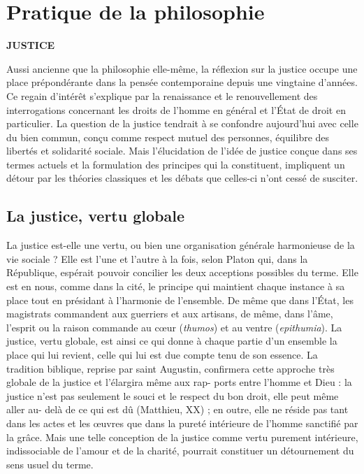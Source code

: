 
\section{Pratique de la philosophie}

{\bf JUSTICE}

Aussi ancienne que la philosophie elle-même, la réflexion sur la justice occupe
une place prépondérante dans la pensée
contemporaine depuis une vingtaine
d'années. Ce regain d'intérêt s'explique
par la renaissance et le renouvellement
des interrogations concernant les droits
de l’homme en général et l’État de droit
en particulier. La question de la justice
tendrait à se confondre aujourd’hui avec
%
celle du bien commun, conçu comme
respect mutuel des personnes, équilibre
des libertés et solidarité sociale. Mais
l'élucidation de l’idée de justice conçue
dans ses termes actuels et la formulation
des principes qui la constituent,
impliquent un détour par les théories
classiques et les débats que celles-ci
n'ont cessé de susciter.

\subsection{La justice, vertu globale}

La justice est-elle une vertu, ou bien
une organisation générale harmonieuse
de la vie sociale ? Elle est l’une et l’autre
à la fois, selon Platon qui, dans la République, espérait pouvoir concilier les
deux acceptions possibles du terme. Elle
est en nous, comme dans la cité, le principe qui maintient chaque instance à sa
place tout en présidant à l'harmonie de
l’ensemble. De même que dans l'État,
les magistrats commandent aux guerriers
et aux artisans, de même, dans l’âme,
l'esprit ou la raison commande au cœur
({\it thumos}) et au ventre ({\it epithumia}). La
justice, vertu globale, est ainsi ce qui
donne à chaque partie d’un ensemble la
place qui lui revient, celle qui lui est due
compte tenu de son essence. La tradition
biblique, reprise par saint Augustin,
confirmera cette approche très globale
de la justice et l’élargira même aux rap-
ports entre l’homme et Dieu : la justice
n'est pas seulement le souci et le respect
du bon droit, elle peut même aller au-
delà de ce qui est dû (Matthieu, XX) ; en
outre, elle ne réside pas tant dans les
actes et les œuvres que dans la pureté
intérieure de l’homme sanctifié par la
grâce. Mais une telle conception de la
justice comme vertu purement intérieure, indissociable de l'amour et de la
charité, pourrait constituer un détournement du sens usuel du terme.

